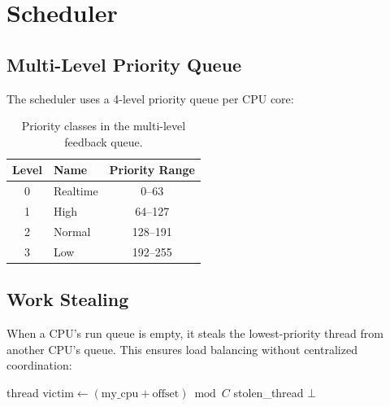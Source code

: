 \documentclass[11pt,letterpaper]{article}
\theoremstyle{definition}
\begin{document}
\section{Scheduler}
\label{sec:sched}

\subsection{Multi-Level Priority Queue}

The scheduler uses a 4-level priority queue per CPU core:

\begin{table}[h]
\centering
\begin{tabular}{clc}
\toprule
\textbf{Level} & \textbf{Name} & \textbf{Priority Range} \\
\midrule
0 & Realtime & 0--63 \\
1 & High & 64--127 \\
2 & Normal & 128--191 \\
3 & Low & 192--255 \\
\bottomrule
\end{tabular}
\caption{Priority classes in the multi-level feedback queue.}
\label{tab:priority}
\end{table}

\subsection{Work Stealing}

When a CPU's run queue is empty, it steals the lowest-priority thread from
another CPU's queue. This ensures load balancing without centralized
coordination:

\begin{algorithm}[h]
\caption{Work Stealing}
\begin{algorithmic}[1]
        \State \Return thread 
    \EndIf
        \State $\text{victim} \gets (\text{my\_cpu} + \text{offset}) \bmod C$
                \State \Return stolen\_thread
            \EndIf
        \EndIf
    \EndFor
    \State \Return $\bot$ 
\EndProcedure
\end{algorithmic}
\end{algorithm}
\end{document}
